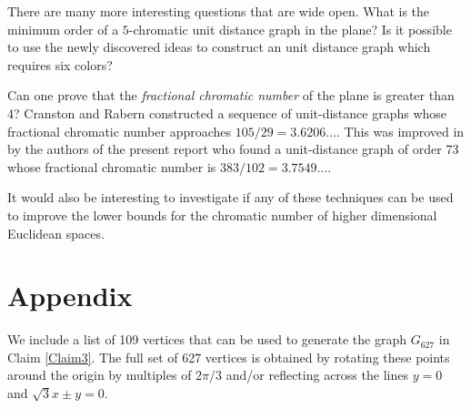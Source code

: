 \documentclass [11pt,oneside]{amsart}
\theoremstyle{definition}
\theoremstyle{plain}
\begin{document}
There are many more interesting questions that are wide open. What is the minimum order of a $5$-chromatic unit distance graph in the plane? Is it possible to
use the newly discovered ideas to construct an unit distance graph which requires six colors?

Can one prove that the \emph{fractional chromatic number} of the plane is greater than 4? Cranston and Rabern \cite{CR} constructed a sequence of unit-distance graphs
whose fractional chromatic number approaches $105/29=3.6206\ldots$. This was improved in \cite{EI} by the authors of the present report  who found a unit-distance graph of order
73 whose fractional chromatic number is $383/102=3.7549\ldots$.

It would also be interesting to investigate if any of these techniques can be used to improve the lower bounds for the chromatic number of higher dimensional Euclidean spaces.

\section{\bf Appendix}
We include a list of 109 vertices that can be used to generate the graph $G_{627}$ in Claim \ref{Claim3}.
The full set of 627 vertices is obtained by rotating these points around the origin by multiples of $2\pi/3$
and/or reflecting across the lines $y=0$ and $\sqrt{3}x\pm y =0$.
\end{document}

